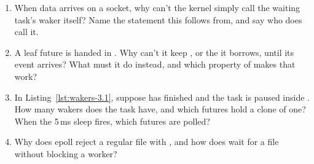 \begin{Exercise}[title={Futures, tasks and wakers}]
    \begin{enumerate}
        \item When data arrives on a socket, why can't the kernel simply call the waiting task's waker itself? Name the statement this follows from, and say who does call it.
        \item A leaf future is handed  in . Why can't it keep , or the  it borrows, until its event arrives? What must it do instead, and which property of  makes that work?
        \item In Listing~\ref{lst:wakers-3.1}, suppose  has finished and the task is paused inside . How many wakers does the task have, and which futures hold a clone of one? When the 5\,ms sleep fires, which futures are polled?
        \item Why does epoll reject a regular file with , and how does  wait for a file without blocking a worker?
    \end{enumerate}
\end{Exercise}
